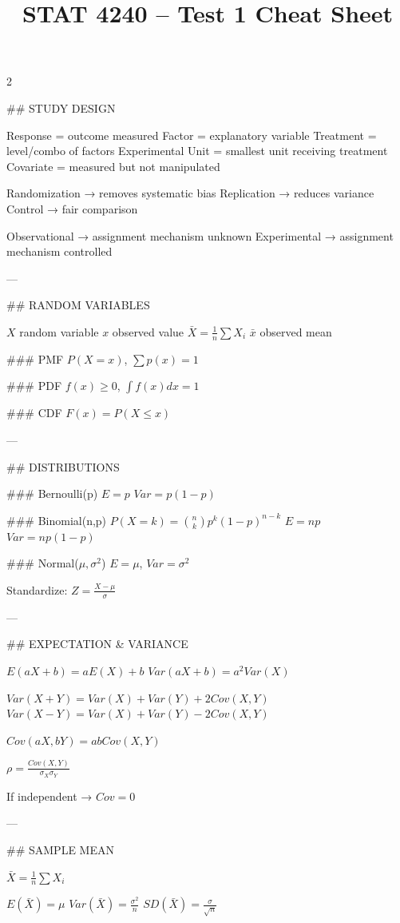 \documentclass[
  9pt,
]{article}
\title{STAT 4240 -- Test 1 Cheat Sheet}
\author{}
\date{}
\begin{document}
\maketitle


\begin{multicols}{2}
\footnotesize

## STUDY DESIGN

Response = outcome measured  
Factor = explanatory variable  
Treatment = level/combo of factors  
Experimental Unit = smallest unit receiving treatment  
Covariate = measured but not manipulated  

Randomization → removes systematic bias  
Replication → reduces variance  
Control → fair comparison  

Observational → assignment mechanism unknown  
Experimental → assignment mechanism controlled  

---

## RANDOM VARIABLES

$X$ random variable  
$x$ observed value  
$\bar X = \frac{1}{n} \sum X_i$  
$\bar x$ observed mean  

### PMF
$P(X=x)$, $\sum p(x)=1$

### PDF
$f(x)\ge0$, $\int f(x)dx=1$

### CDF
$F(x)=P(X\le x)$

---

## DISTRIBUTIONS

### Bernoulli(p)
$E=p$  
$Var=p(1-p)$

### Binomial(n,p)
$P(X=k)=\binom{n}{k}p^k(1-p)^{n-k}$  
$E=np$  
$Var=np(1-p)$

### Normal($\mu,\sigma^2$)
$E=\mu$, $Var=\sigma^2$  

Standardize:
$Z=\frac{X-\mu}{\sigma}$

---

## EXPECTATION & VARIANCE

$E(aX+b)=aE(X)+b$  
$Var(aX+b)=a^2Var(X)$

$Var(X+Y)=Var(X)+Var(Y)+2Cov(X,Y)$  
$Var(X-Y)=Var(X)+Var(Y)-2Cov(X,Y)$

$Cov(aX,bY)=abCov(X,Y)$

$\rho=\frac{Cov(X,Y)}{\sigma_X\sigma_Y}$

If independent → $Cov=0$

---

## SAMPLE MEAN

$\bar X=\frac{1}{n}\sum X_i$

$E(\bar X)=\mu$  
$Var(\bar X)=\frac{\sigma^2}{n}$  
$SD(\bar X)=\frac{\sigma}{\sqrt n}$


\end{multicols}
\end{document}
